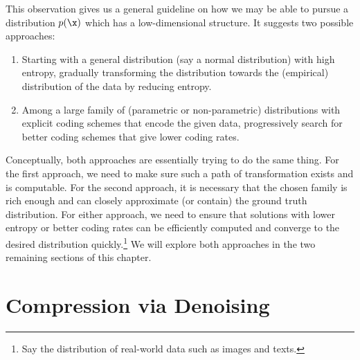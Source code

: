 \documentclass[../../book-main.tex]{subfiles}
\begin{document}
This observation gives us a general guideline on how we may be able to pursue a distribution $p(\x)$ which has a low-dimensional structure. It suggests two possible approaches:
\begin{enumerate}
	\item Starting with a general distribution (say a normal distribution) with high entropy, gradually transforming the distribution towards the (empirical) distribution of the data by reducing entropy.
	\item Among a large family of (parametric or non-parametric) distributions with explicit coding schemes that encode the given data, progressively search for better coding schemes that give lower coding rates.
\end{enumerate}
Conceptually, both approaches are essentially trying to do the same thing. For the first approach, we need to make sure such a path of transformation exists and is computable. For the second approach, it is necessary that the chosen family is rich enough and can closely approximate (or contain) the ground truth distribution. For either approach, we need to ensure that solutions with lower entropy or better coding rates can be efficiently computed and converge to the desired distribution quickly.\footnote{Say the distribution of real-world data such as images and texts.} We will explore both approaches in the two remaining sections of this chapter.  %

\section{Compression via Denoising}\label{sub:compression_denoising}
\end{document}
